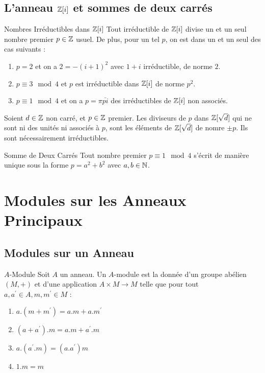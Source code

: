 \documentclass{cours}
\begin{document}
\subsection{L'anneau $\mathbb{Z}[i]$ et sommes de deux carrés}
\begin{théorème}{Nombres Irréductibles dans $\mathbb{Z}[i]$}{}
    Tout irréductible de $\mathbb{Z}[i]$ divise un et un seul nombre premier $p\in \mathbb{Z}$ usuel. De plus, pour un tel $p$, on est dans un et un seul des cas suivants :
    \begin{enumerate}
        \item $p = 2$ et on a $2 = -(i + 1)^{2}$ avec $1 + i$ irréductible, de norme $2$.
        \item $p\equiv 3 \mod 4$ et $p$ est irréductible dans $\mathbb{Z}[i]$ de norme $p^{2}$.
        \item $p \equiv 1 \mod 4$ et on a $p = \pi \bar{pi}$ des irréductibles de $\mathbb{Z}[i]$ non associés.
    \end{enumerate}
\end{théorème}

\begin{lemma}
    Soient $d \in \mathbb{Z}$ non carré, et $p \in \mathbb{Z}$ premier. Les diviseurs de $p$ dans $\mathbb{Z}[\sqrt{d}]$ qui ne sont ni des unités ni associés à $p$, sont les éléments de $\mathbb{Z}[\sqrt{d}]$ de nomre $\pm p$. Ils sont nécessairement irréductibles.
\end{lemma}

\begin{propositionfr}{Somme de Deux Carrés}{}
    Tout nombre premier $p \equiv 1 \mod 4$ s'écrit de manière unique sous la forme $p = a^{2} + b^{2}$ avec $a, b \in \mathbb{N}$.
\end{propositionfr}

\section{Modules sur les Anneaux Principaux}
\subsection{Modules sur un Anneau}
\begin{définition}{$A$-Module}{}
    Soit $A$ un anneau. Un $A$-module est la donnée d'un groupe abélien $\left(M, +\right)$ et d'une application $A \times M \rightarrow M$ telle que pour tout $a, a^{'} \in A, m, m^{'} \in M$ :
    \begin{enumerate}
        \item $a.(m+m^{'}) = a.m + a.m^{'}$
        \item $(a+a^{'}).m = a.m + a^{'}.m$
        \item $a.(a^{'}.m) = (a.a^{'})m$
        \item $1.m = m$
    \end{enumerate}
\end{définition}
\end{document}
